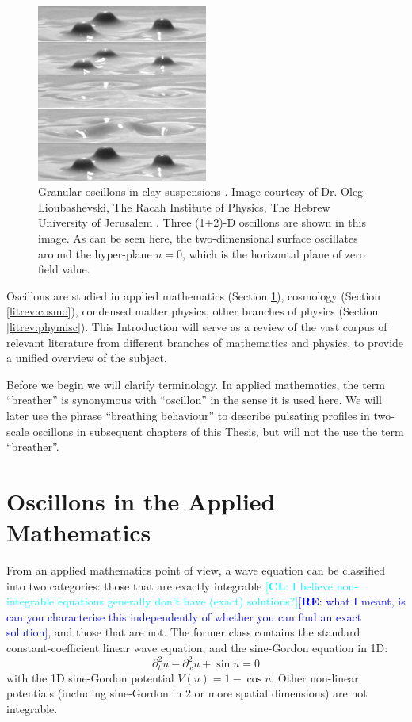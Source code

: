 \documentclass{report}
\newcommand{\re}[1]{\textcolor{blue}{[{\bf RE}: #1]}}
\newcommand{\cl}[1]{\textcolor{cyan}{[{\bf CL}: #1]}}
\begin{document}
\begin{figure}\centering
  \includegraphics[width=0.5\textwidth]{plot/oscillon-non-newton.jpg}
  \caption{Granular oscillons in clay suspensions \cite{PhysRevLett.83.3190}. Image courtesy of Dr. Oleg Lioubashevski, The Racah Institute of Physics, The Hebrew University of Jerusalem \cite{blazelab}. Three (1+2)-D oscillons are shown in this image. As can be seen here, the two-dimensional surface oscillates around the hyper-plane $u=0$, which is the horizontal plane of zero field value.}
  \label{nntliquid}
\end{figure}

Oscillons are studied in applied mathematics (Section \ref{litrev:appm}), cosmology (Section \ref{litrev:cosmo}), condensed matter physics, other branches of physics (Section \ref{litrev:phymisc}). This Introduction will serve as a review of the vast corpus of relevant literature from different branches of mathematics and physics, to provide a unified overview of the subject.

Before we begin we will clarify terminology. In applied mathematics, the term ``breather'' is synonymous with ``oscillon'' in the sense it is used here. We will later use the phrase ``breathing behaviour'' to describe pulsating profiles in two-scale oscillons in subsequent chapters of this Thesis, but will not the use the term ``breather''.

\section{Oscillons in the Applied Mathematics}\label{litrev:appm}
From an applied mathematics point of view, a wave equation can be classified into two categories: those that are exactly integrable \cl{I believe non-integrable equations generally don't have (exact) solutions?}\re{what I meant, is can you characterise this independently of whether you can find an exact solution}, and those that are not. The former class contains the standard constant-coefficient linear wave equation, and the sine-Gordon equation in 1D:
\begin{equation}
  \partial^2_t u - \partial^2_x u + \sin u = 0
\end{equation}
with the 1D sine-Gordon potential $V(u) = 1-\cos u$. Other non-linear potentials (including sine-Gordon in 2 or more spatial dimensions) are not integrable.
\end{document}
